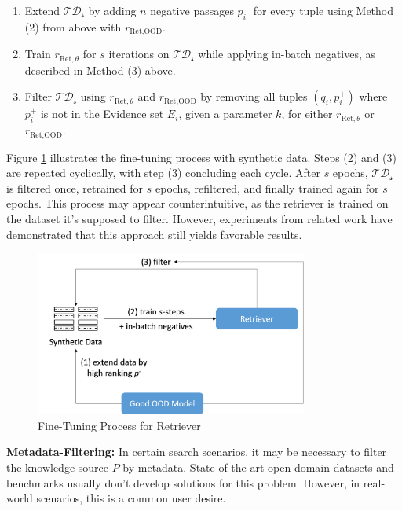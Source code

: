 \begin{enumerate}
    \item Extend $\mathcal{TD_s}$ by adding $n$ negative passages $p_i^-$ for every tuple using Method (2) from above with $r_{\text{Ret},\text{OOD}}$.
    \item Train $r_{\text{Ret}, \theta}$ for $s$ iterations on $\mathcal{TD_s}$ while applying in-batch negatives, as described in Method (3) above.
    \item Filter $\mathcal{TD_s}$ using $r_{\text{Ret}, \theta}$ and $r_{\text{Ret}, \text{OOD}}$ by removing all tuples $(q_i, p_i^+)$ where $p_i^+$ is not in the Evidence set $E_i$, given a parameter $k$, for either $r_{\text{Ret}, \theta}$ or $r_{\text{Ret}, \text{OOD}}$.
\end{enumerate}

Figure \ref{fig:retriever-fine-tuning} illustrates the fine-tuning process with synthetic data. Steps (2) and (3) are repeated cyclically, with step (3) concluding each cycle. After $s$ epochs, $\mathcal{TD_s}$ is filtered once, retrained for $s$ epochs, refiltered, and finally trained again for $s$ epochs. This process may appear counterintuitive, as the retriever is trained on the dataset it's supposed to filter. However, experiments from related work \cite{dai_promptagator_2022} have demonstrated that this approach still yields favorable results.


\begin{figure}
   \centering
    \includegraphics[width=0.8\textwidth]{Grafiken/Training.png}
    \caption{Fine-Tuning Process for Retriever}
    \label{fig:retriever-fine-tuning} 
\end{figure}

\vspace{\baselineskip}

\textbf{Metadata-Filtering:} In certain search scenarios, it may be necessary to filter the knowledge source $P$ by metadata. State-of-the-art open-domain datasets and benchmarks usually don't develop solutions for this problem. However, in real-world scenarios, this is a common user desire.

